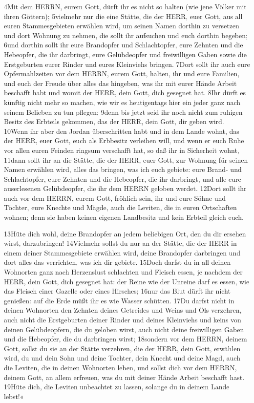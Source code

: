 4Mit dem HERRN, eurem Gott, dürft ihr es nicht so halten (wie jene
Völker mit ihren Göttern); 5vielmehr nur die eine Stätte, die der HERR,
euer Gott, aus all euren Stammesgebieten erwählen wird, um seinen Namen
dorthin zu versetzen und dort Wohnung zu nehmen, die sollt ihr aufsuchen
und euch dorthin begeben; 6und dorthin sollt ihr eure Brandopfer und
Schlachtopfer, eure Zehnten und die Hebeopfer, die ihr darbringt, eure
Gelübdeopfer und freiwilligen Gaben sowie die Erstgeburten eurer Rinder
und eures Kleinviehs bringen. 7Dort sollt ihr auch eure Opfermahlzeiten
vor dem HERRN, eurem Gott, halten, ihr und eure Familien, und euch der
Freude über alles das hingeben, was ihr mit eurer Hände Arbeit beschafft
habt und womit der HERR, dein Gott, dich gesegnet hat. 8Ihr dürft es
künftig nicht mehr so machen, wie wir es heutigentags hier ein jeder
ganz nach seinem Belieben zu tun pflegen; 9denn bis jetzt seid ihr noch
nicht zum ruhigen Besitz des Erbteils gekommen, das der HERR, dein Gott,
dir geben wird. 10Wenn ihr aber den Jordan überschritten habt und in dem
Lande wohnt, das der HERR, euer Gott, euch als Erbbesitz verleihen will,
und wenn er euch Ruhe vor allen euren Feinden ringsum verschafft hat, so
daß ihr in Sicherheit wohnt, 11dann sollt ihr an die Stätte, die der
HERR, euer Gott, zur Wohnung für seinen Namen erwählen wird, alles das
bringen, was ich euch gebiete: eure Brand- und Schlachtopfer, eure
Zehnten und die Hebeopfer, die ihr darbringt, und alle eure auserlesenen
Gelübdeopfer, die ihr dem HERRN geloben werdet. 12Dort sollt ihr auch
vor dem HERRN, eurem Gott, fröhlich sein, ihr und eure Söhne und
Töchter, eure Knechte und Mägde, auch die Leviten, die in euren
Ortschaften wohnen; denn sie haben keinen eigenen Landbesitz und kein
Erbteil gleich euch.

13Hüte dich wohl, deine Brandopfer an jedem beliebigen Ort, den du dir
ersehen wirst, darzubringen! 14Vielmehr sollst du nur an der Stätte, die
der HERR in einem deiner Stammesgebiete erwählen wird, deine Brandopfer
darbringen und dort alles das verrichten, was ich dir gebiete. 15Doch
darfst du in all deinen Wohnorten ganz nach Herzenslust schlachten und
Fleisch essen, je nachdem der HERR, dein Gott, dich gesegnet hat: der
Reine wie der Unreine darf es essen, wie das Fleisch einer Gazelle oder
eines Hirsches; 16nur das Blut dürft ihr nicht genießen: auf die Erde
müßt ihr es wie Wasser schütten. 17Du darfst nicht in deinen Wohnorten
den Zehnten deines Getreides und Weins und Öls verzehren, auch nicht die
Erstgeburten deiner Rinder und deines Kleinviehs und keins von deinen
Gelübdeopfern, die du geloben wirst, auch nicht deine freiwilligen Gaben
und die Hebeopfer, die du darbringen wirst; 18sondern vor dem HERRN,
deinem Gott, sollst du sie an der Stätte verzehren, die der HERR, dein
Gott, erwählen wird, du und dein Sohn und deine Tochter, dein Knecht und
deine Magd, auch die Leviten, die in deinen Wohnorten leben, und sollst
dich vor dem HERRN, deinem Gott, an allem erfreuen, was du mit deiner
Hände Arbeit beschafft hast. 19Hüte dich, die Leviten unbeachtet zu
lassen, solange du in deinem Lande lebst!«

